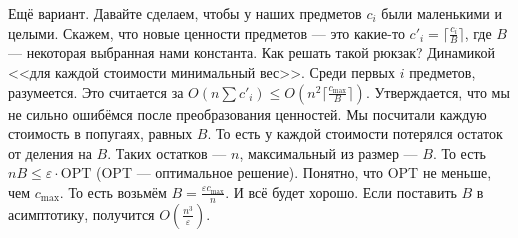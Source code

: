 \documentclass{article}
\begin{document}
    Ещё вариант. Давайте сделаем, чтобы у наших предметов $c_i$ были маленькими и целыми. Скажем, что новые ценности предметов --- это какие-то $c'_i=\lceil\frac{c_i}B\rceil$, где $B$ --- некоторая выбранная нами константа. Как решать такой рюкзак? Динамикой <<для каждой стоимости минимальный вес>>. Среди первых $i$ предметов, разумеется. Это считается за $O(n\sum c'_i)\leqslant O(n^2\lceil\frac{c_{\max}}B\rceil)$. Утверждается, что мы не сильно ошибёмся после преобразования ценностей. Мы посчитали каждую стоимость в попугаях, равных $B$. То есть у каждой стоимости потерялся остаток от деления на $B$. Таких остатков --- $n$, максимальный из размер --- $B$. То есть $nB\leqslant\varepsilon\cdot\mathrm{OPT}$ (OPT --- оптимальное решение). Понятно, что OPT не меньше, чем $c_{\max}$. То есть возьмём $B=\frac{\varepsilon c_{\max}}n$. И всё будет хорошо. Если поставить $B$ в асимптотику, получится $O\left(\frac{n^3}\varepsilon\right)$.
\end{document}
